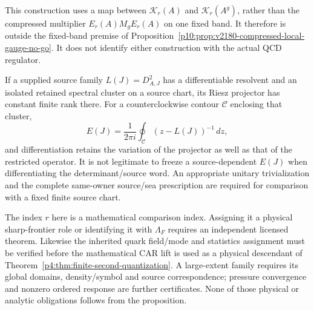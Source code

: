 \documentclass[12pt,a4paper]{article}
\begin{document}
This construction uses a map between $\mathcal K_r(A)$ and
$\mathcal K_r(A^g)$, rather than the compressed multiplier
$E_r(A)M_gE_r(A)$ on one fixed band.  It therefore is outside the
fixed-band premise of
Proposition~\ref{p10:prop:v2180-compressed-local-gauge-no-go}.
It does not identify either construction with the actual QCD regulator.

\begin{remark}
\label{p10:rem:v2186-band-source-scope}
If a supplied source family $L(J)=D_{A,J}^2$ has a differentiable
resolvent and an isolated retained spectral cluster on a source chart, its
Riesz projector has constant finite rank there.  For a counterclockwise
contour $\mathcal C$ enclosing that cluster,
\[
 E(J)=\frac1{2\pi i}\oint_{\mathcal C}(z-L(J))^{-1}\,dz,
\]
and differentiation retains the variation of the projector as well as that
of the restricted operator.  It is not legitimate to freeze a
source-dependent $E(J)$ when differentiating the determinant/source word.
An appropriate unitary trivialization and the complete same-owner
source/sea prescription are required for comparison with a fixed finite
source chart.

The index $r$ here is a mathematical comparison index.  Assigning it a
physical sharp-frontier role or identifying it with $\Lambda_F$ requires an
independent licensed theorem.  Likewise the inherited quark field/mode and
statistics assignment must be verified before the mathematical CAR lift is
used as a physical descendant of
Theorem~\ref{p4:thm:finite-second-quantization}.  A large-extent family
requires its global domains, density/symbol and source correspondence;
pressure convergence and nonzero ordered response are further certificates.
None of those physical or analytic obligations follows from the proposition.
\end{remark}






\end{document}
